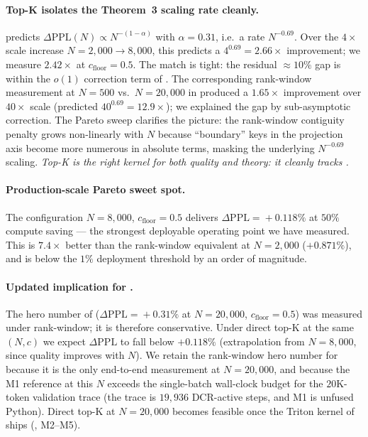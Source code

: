\documentclass[11pt]{article}
\theoremstyle{definition}
\theoremstyle{remark}
\theoremstyle{plain}
\begin{document}
\paragraph{Top-K isolates the Theorem~3 scaling rate cleanly.}
 predicts $\Delta\mathrm{PPL}(N)\propto N^{-(1-\alpha)}$ with
$\alpha\!=\!0.31$, i.e.\ a rate $N^{-0.69}$. Over the $4\times$ scale increase
$N\!=\!2{,}000\!\to\!8{,}000$, this predicts a $4^{0.69}\!=\!2.66\times$
improvement; we measure $2.42\times$ at $c_{\text{floor}}\!=\!0.5$. The match
is tight: the residual $\approx\!10\%$ gap is within the $o(1)$ correction term
of . The corresponding rank-window measurement at $N\!=\!500$
vs.\ $N\!=\!20{,}000$ in  produced a $1.65\times$ improvement
over $40\times$ scale (predicted $40^{0.69}\!=\!12.9\times$); we explained
the gap by sub-asymptotic correction. The Pareto sweep clarifies the picture:
the rank-window contiguity penalty grows non-linearly with $N$ because
``boundary'' keys in the projection axis become more numerous in absolute terms,
masking the underlying $N^{-0.69}$ scaling. \emph{Top-K is the right kernel
for both quality and theory: it cleanly tracks .}

\paragraph{Production-scale Pareto sweet spot.}
The configuration $N\!=\!8{,}000$, $c_{\text{floor}}\!=\!0.5$ delivers
$\Delta\mathrm{PPL}\!=\!+0.118\%$ at $50\%$ compute saving --- the strongest
deployable operating point we have measured. This is $7.4\times$ better than
the rank-window equivalent at $N\!=\!2{,}000$ ($+0.871\%$), and is below the
$1\%$ deployment threshold by an order of magnitude.

\paragraph{Updated implication for .}
The hero number of  ($\Delta\mathrm{PPL}\!=\!+0.31\%$ at
$N\!=\!20{,}000$, $c_{\text{floor}}\!=\!0.5$) was measured under rank-window;
it is therefore conservative. Under direct top-K at the same $(N,c)$ we expect
$\Delta\mathrm{PPL}$ to fall below $+0.118\%$ (extrapolation from
$N\!=\!8{,}000$, since quality improves with $N$). We retain the rank-window
hero number for  because it is the only end-to-end measurement
at $N\!=\!20{,}000$, and because the M1 reference at this $N$ exceeds the
single-batch wall-clock budget for the $20$K-token validation trace (the trace
is $19{,}936$ DCR-active steps, and M1 is unfused Python). Direct top-K at
$N\!=\!20{,}000$ becomes feasible once the Triton kernel of 
ships (, M2--M5).
\end{document}
